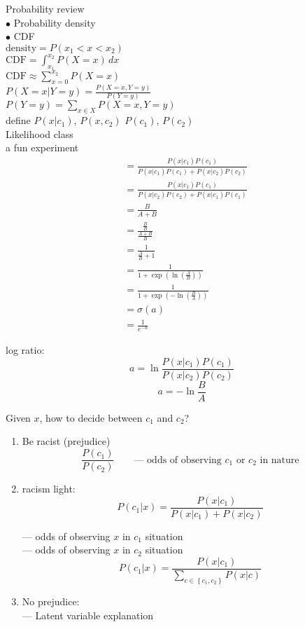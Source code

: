 Probability review\\ 

$\bullet$ Probability density\\
$\bullet$ CDF\\
$\text{density} = P(x_1<x<x_2)$\\
$\text{CDF} = \int_{x_1}^{x_2}P(X=x)\,dx$\\
$\text{CDF} \approx \sum_{x=0}^{x_2}P(X=x)$\\
$P(X=x|Y=y) = \frac{P(X=x,Y=y)}{P(Y=y)}$\\
$P(Y=y) = \sum_{x\in X}P(X=x,Y=y)$\\

define $P(x|c_1)$, $P(x,c_2)$ $P(c_1)$, $P(c_2)$\\
Likelihood class\\

a fun experiment\\
\begin{align*}
 & = \frac{P(x|c_1)P(c_1)}{P(x|c_1)P(c_1)+P(x|c_2)P(c_2)}\\
 & =\frac{P(x|c_1)P(c_1)}{P(x|c_2)P(c_2)+P(x|c_1)P(c_1)}\\
 & = \frac{B}{A+B} \\
 & = \frac{\frac{B}{B}}{\frac{A+B}{B}}\\
 & = \frac{1}{\frac{A}{B}+1}\\
 & = \frac{1}{1+\exp\left(\ln\left(\frac{A}{B}\right)\right)}\\
 & = \frac{1}{1+\exp\left(-\ln\left(\frac{B}{A}\right)\right)}\\
 & = \sigma(a)\\
 & = \frac{1}{e^{-a}}
\end{align*}

log ratio:
\begin{equation*}
a = \ln\frac{P(x|c_1)P(c_1)}{P(x|c_2)P(c_2)}
\end{equation*}
\begin{equation*}
a = -\ln\frac{B}{A}
\end{equation*}

Given $x$, how to decide between $c_1$ and $c_2$?
\begin{enumerate}[label=\circled{\arabic*}]
\item Be racist (prejudice)
\begin{equation*}
\frac{P(c_1)}{P(c_2)}\qquad\text{--- odds of observing $c_1$ or $c_2$ in nature}
\end{equation*}
\item racism light:
\begin{equation*}
P(c_1|x) = \frac{P(x|c_1)}{P(x|c_1)+P(x|c_2)}
\end{equation*}

--- odds of observing $x$ in $c_1$ situation\\
--- odds of observing $x$ in $c_2$ situation
\begin{equation*}
P(c_1|x) = \frac{P(x|c_1)}{\sum_{c\in\left\{c_1,c_2\right\}}P(x|c)}
\end{equation*}
\item No prejudice:\\
--- Latent variable explanation
\end{enumerate}

